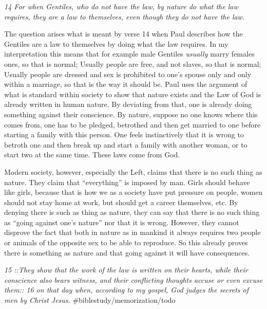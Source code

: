 \emph{14 For when Gentiles, who do not have the law, by nature do what
the law requires, they are a law to themselves, even though they do not
have the law.}

The question arises what is meant by verse 14 when Paul describes how
the Gentiles are a law to themselves by doing what the law requires. In
my interpretation this means that for example male Gentiles
\emph{usually} marry females ones, so that is normal; Usually people are
free, and not slaves, so that is normal; Usually people are dressed and
sex is prohibited to one's spouse only and only within a marriage, so
that is the way it should be. Paul uses the argument of what is standard
within society to show that nature exists and the Law of God is already
written in human nature. By deviating from that, one is already doing
something against their conscience. By nature, suppose no one knows
where this comes from, one has to be pledged, betrothed and then get
married to one before starting a family with this person. One feels
instinctively that it is wrong to betroth one and then break up and
start a family with another woman, or to start two at the same time.
These laws come from God.

Modern society, however, especially the Left, claims that there is no
such thing as nature. They claim that ``everything'' is imposed by man.
Girls should behave like girls, because that is how we as a society have
put pressure on people, women should not stay home at work, but should
get a career themselves, etc. By denying there is such as thing as
nature, they can say that there is no such thing as ``going against
one's nature'' nor that it is wrong. However, they cannot disprove the
fact that both in nature as in mankind it always requires two people or
animals of the opposite sex to be able to reproduce. So this already
proves there is something as nature and that going against it will have
consequences.

\emph{15 ::They show that the work of the law is written on their
hearts, while their conscience also bears witness, and their conflicting
thoughts accuse or even excuse them:: 16 on that day when, according to
my gospel, God judges the secrets of men by Christ Jesus.}
\#biblestudy/memorization/todo

